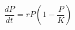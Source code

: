 \documentclass[aspectratio=169]{beamer}
\begin{document}
\begin{wallpaperframe}
\Huge
\[
\frac{dP}{dt} = rP\!\left(1 - \frac{P}{K}\right)
\]
\end{wallpaperframe}
\end{document}
